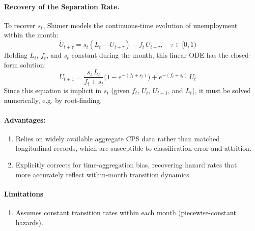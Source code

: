 \documentclass[dvipsnames,11pt]{article}
\begin{document}
\begin{enumerate}
\begin{solution}
                    \paragraph{Recovery of the Separation Rate.}
                        To recover $s_t$, Shimer models the continuous-time evolution of unemployment within the month:
                        \begin{equation}
                            \dot{U}_{t+\tau} = s_t (L_t - U_{t+\tau}) - f_t\, U_{t+\tau}, \quad \tau \in [0,1)
                        \end{equation}
                        Holding $L_t$, $f_t$, and $s_t$ constant during the month, this linear ODE has the closed-form solution:
                        \begin{equation}
                            U_{t+1} = \frac{s_t\, L_t}{f_t + s_t}\bigl(1 - e^{-(f_t + s_t)}\bigr) + e^{-(f_t + s_t)}\, U_t
                        \end{equation}
                        Since this equation is implicit in $s_t$ (given $f_t$, $U_t$, $U_{t+1}$, and $L_t$), it must be solved numerically, e.g. by root-finding.

                    \paragraph{Advantages:}
                    
                        \begin{enumerate}
                            \item Relies on widely available aggregate CPS data rather than matched longitudinal records, which are susceptible to classification error and attrition.
                            
                            \item Explicitly corrects for time-aggregation bias, recovering hazard rates that more accurately reflect within-month transition dynamics.
                        \end{enumerate}
                    
                    \paragraph{Limitations}
                    
                        \begin{enumerate}
                            \item Assumes constant transition rates within each month (piecewise-constant hazards).
                            

\end{enumerate}
\end{solution}
\end{enumerate}
\end{document}

